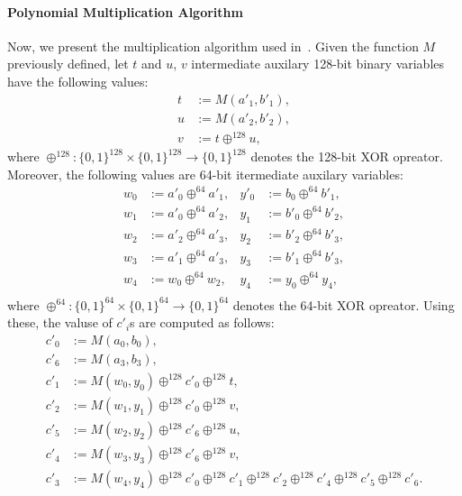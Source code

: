 \paragraph{Polynomial Multiplication Algorithm}
Now, we present the multiplication algorithm used in~\cite{libiop}. Given the function $M$ previously defined, let $t$ and $u$, $v$ intermediate auxilary 128-bit binary variables have the following values:
\begin{align*}
	t &:= M(a'_1,b'_1), \\
	u &:= M(a'_2,b'_2), \\
	v &:= t \oplus^{128} u,
\end{align*}
where $\oplus^{128}:\{0,1\}^{128}\times\{0,1\}^{128} \rightarrow \{0,1\}^{128}$ denotes the 128-bit XOR opreator. Moreover, the following values are 64-bit itermediate auxilary variables:
\begin{align*}
	w_0 &:= a'_0 \oplus^{64} a'_1,  &y'_0 &:= b_0 \oplus^{64} b'_1, \\
	w_1 &:= a'_0 \oplus^{64} a'_2,  &y_1 &:= b'_0 \oplus^{64} b'_2, \\
	w_2 &:= a'_2 \oplus^{64} a'_3,  &y_2 &:= b'_2 \oplus^{64} b'_3, \\
	w_3 &:= a'_1 \oplus^{64} a'_3,  &y_3 &:= b'_1 \oplus^{64} b'_3, \\
	w_4 &:= w_0 \oplus^{64} w_2,  &y_4 &:= y_0 \oplus^{64} y_4, \\
\end{align*}
where $\oplus^{64}:\{0,1\}^{64}\times\{0,1\}^{64} \rightarrow \{0,1\}^{64}$ denotes the 64-bit XOR opreator.
Using these, the valuse of $c'_i$s are computed as follows:
 \begin{align*}
 	c'_0 &:= M(a_0,b_0), \\
 	c'_6 &:= M(a_3,b_3), \\
 	c'_1 &:= M(w_0, y_0) \oplus^{128} c'_0 \oplus^{128} t, \\
 	c'_2 &:= M(w_1, y_1) \oplus^{128} c'_0 \oplus^{128} v, \\
 	c'_5 &:= M(w_2, y_2) \oplus^{128} c'_6 \oplus^{128} u, \\
 	c'_4 &:= M(w_3, y_3) \oplus^{128} c'_6 \oplus^{128} v, \\
 	c'_3 &:= M(w_4, y_4) \oplus^{128} c'_0 \oplus^{128} c'_1 \oplus^{128} c'_2 \oplus^{128} c'_4 \oplus^{128} c'_5 \oplus^{128} c'_6. \\
 \end{align*}
 
